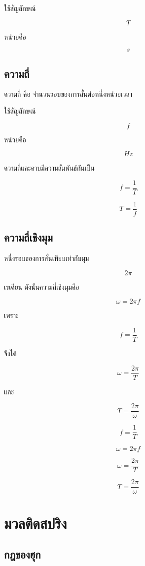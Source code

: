 ใช้สัญลักษณ์

\[
T
\]

หน่วยคือ

\[
\si{s}
\]

\subsection{ความถี่}

ความถี่ คือ จำนวนรอบของการสั่นต่อหนึ่งหน่วยเวลา

ใช้สัญลักษณ์

\[
f
\]

หน่วยคือ

\[
\si{Hz}
\]

ความถี่และคาบมีความสัมพันธ์กันเป็น

\[
f=\frac{1}{T}
\]

\[
T=\frac{1}{f}
\]

\subsection{ความถี่เชิงมุม}

หนึ่งรอบของการสั่นเทียบเท่ากับมุม

\[
2\pi
\]

เรเดียน ดังนั้นความถี่เชิงมุมคือ

\[
\omega=2\pi f
\]

เพราะ

\[
f=\frac{1}{T}
\]

จึงได้

\[
\omega=\frac{2\pi}{T}
\]

และ

\[
T=\frac{2\pi}{\omega}
\]

\begin{tcolorbox}[title=ความสัมพันธ์พื้นฐาน]
\[
f=\frac{1}{T}
\]

\[
\omega=2\pi f
\]

\[
\omega=\frac{2\pi}{T}
\]

\[
T=\frac{2\pi}{\omega}
\]
\end{tcolorbox}

\section{มวลติดสปริง}

\subsection{กฎของฮุก}

